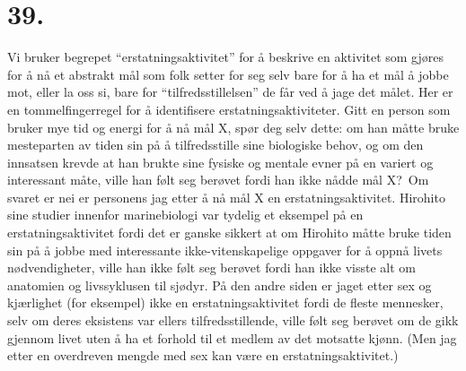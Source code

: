 \documentclass[oneside]{book}
\begin{document}
\section*{39.}
Vi bruker begrepet ``erstatningsaktivitet'' for å beskrive en aktivitet som
gjøres for å nå et abstrakt mål som folk setter for seg selv bare for å ha et
mål å jobbe mot, eller la oss si, bare for ``tilfredsstillelsen'' de får ved å
jage det målet. Her er en tommelfingerregel for å identifisere 
erstatningsaktiviteter. Gitt en person som bruker mye tid og 
energi for å nå mål X, spør deg selv dette: om han måtte 
bruke mesteparten av tiden sin på å tilfredsstille sine biologiske behov, 
og om den innsatsen krevde at han brukte sine fysiske og mentale evner 
på en variert og interessant måte, ville han følt seg berøvet fordi 
han ikke nådde mål X?\ Om svaret er nei er personens jag etter å nå
mål X en erstatningsaktivitet. Hirohito sine studier innenfor 
marinebiologi var tydelig et eksempel på en erstatningsaktivitet 
fordi det er ganske sikkert at om Hirohito måtte bruke tiden sin 
på å jobbe med interessante ikke-vitenskapelige oppgaver for å oppnå 
livets nødvendigheter, ville han ikke følt seg berøvet fordi han ikke 
visste alt om anatomien og livssyklusen til sjødyr. På den andre siden 
er jaget etter sex og kjærlighet (for eksempel) ikke en erstatningsaktivitet 
fordi de fleste mennesker, selv om deres eksistens var ellers tilfredsstillende, 
ville følt seg berøvet om de gikk gjennom livet uten å ha et forhold til et 
medlem av det motsatte kjønn. (Men jag etter en overdreven mengde med sex kan 
være en erstatningsaktivitet.)
\end{document}
